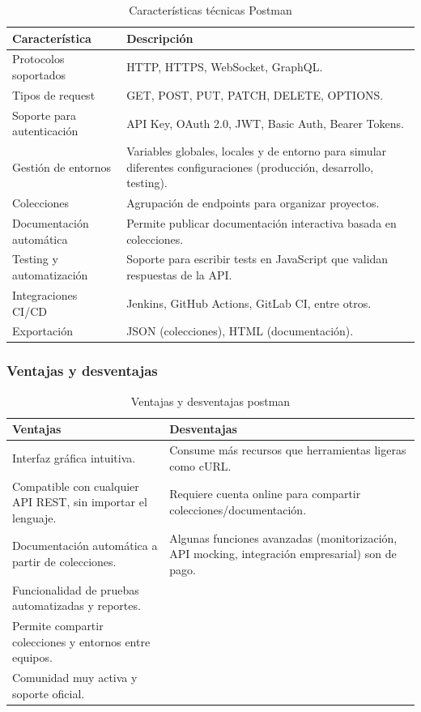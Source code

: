 \documentclass[man, floatsintext]{apa7}
\begin{document}
	\begin{table}[h!]
		\centering
		\begin{tabular}{|p{5cm}|p{9cm}|}
			\hline
			\textbf{Característica} & \textbf{Descripción} \\ \hline
			Protocolos soportados & HTTP, HTTPS, WebSocket, GraphQL. \\ \hline
			Tipos de request & GET, POST, PUT, PATCH, DELETE, OPTIONS. \\ \hline
			Soporte para autenticación & API Key, OAuth 2.0, JWT, Basic Auth, Bearer Tokens. \\ \hline
			Gestión de entornos & Variables globales, locales y de entorno para simular diferentes configuraciones (producción, desarrollo, testing). \\ \hline
			Colecciones & Agrupación de endpoints para organizar proyectos. \\ \hline
			Documentación automática & Permite publicar documentación interactiva basada en colecciones. \\ \hline
			Testing y automatización & Soporte para escribir tests en JavaScript que validan respuestas de la API. \\ \hline
			Integraciones CI/CD & Jenkins, GitHub Actions, GitLab CI, entre otros. \\ \hline
			Exportación & JSON (colecciones), HTML (documentación). \\ \hline
		\end{tabular}
		\caption{Características técnicas Postman}
		\label{tab:caracteristicas_tecnicas}
	\end{table}
	\FloatBarrier

	\subsubsection{Ventajas y desventajas}\cite{formadoresit_postman_ventajas}
	
	\begin{table}[h!]
		\centering
		\begin{tabular}{|p{6cm}|p{6cm}|}
			\hline
			\textbf{Ventajas} & \textbf{Desventajas} \\ \hline
			Interfaz gráfica intuitiva. & Consume más recursos que herramientas ligeras como cURL. \\ \hline
			Compatible con cualquier API REST, sin importar el lenguaje. & Requiere cuenta online para compartir colecciones/documentación. \\ \hline
			Documentación automática a partir de colecciones. & Algunas funciones avanzadas (monitorización, API mocking, integración empresarial) son de pago. \\ \hline
			Funcionalidad de pruebas automatizadas y reportes. & \\ \hline
			Permite compartir colecciones y entornos entre equipos. & \\ \hline
			Comunidad muy activa y soporte oficial. & \\ \hline
		\end{tabular}
		\caption{Ventajas y desventajas postman}
		\label{tab:ventajas_desventajas}
	\end{table}
	\FloatBarrier
\end{document}
